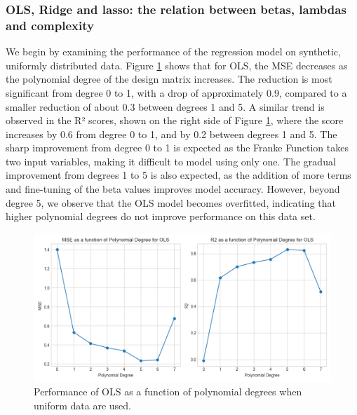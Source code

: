 \subsubsection{OLS, Ridge and lasso: the relation between betas, lambdas and complexity}
We begin by examining the performance of the regression model on synthetic, uniformly distributed data. Figure \ref{fig:ols mse} shows that for OLS, the MSE decreases as the polynomial degree of the design matrix increases. The reduction is most significant from degree 0 to 1, with a drop of approximately 0.9, compared to a smaller reduction of about 0.3 between degrees 1 and 5. A similar trend is observed in the R² scores, shown on the right side of Figure \ref{fig:ols mse}, where the score increases by 0.6 from degree 0 to 1, and by 0.2 between degrees 1 and 5. The sharp improvement from degree 0 to 1 is expected as the Franke Function takes two input variables, making it difficult to model using only one. The gradual improvement from degrees 1 to 5 is also expected, as the addition of more terms and fine-tuning of the beta values improves model accuracy. However, beyond degree 5, we observe that the OLS model becomes overfitted, indicating that higher polynomial degrees do not improve performance on this data set.

\begin{figure}[H]
     \includegraphics[width=15cm]{Images/OLS_error_degree.png}
     \caption{Performance of OLS as a function of polynomial degrees when uniform data are used.}
     \label{fig:ols mse}
\end{figure}

